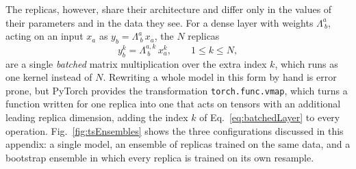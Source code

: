 The replicas, however, share their architecture and differ only in the values of their parameters and in the data they see.
%
For a dense layer with weights \(\Lambda^a_{\ b}\), acting on an input \(x_a\) as \(y_b = \Lambda^a_{\ b}\,x_a\), the \(N\) replicas
\begin{equation}
	y^{k}_{b} = \Lambda^{a,k}_{\ b}\,x^{k}_{a}, \qquad 1 \leq k \leq N,
	\label{eq:batchedLayer}
\end{equation}
are a single \emph{batched} matrix multiplication over the extra index \(k\), which runs as one kernel instead of \(N\).
%
Rewriting a whole model in this form by hand is error prone, but PyTorch provides the transformation \texttt{torch.func.vmap}, which turns a function written for one replica into one that acts on tensors with an additional leading replica dimension, adding the index \(k\) of Eq.~\ref{eq:batchedLayer} to every operation.
%
Fig.~\ref{fig:tsEnsembles} shows the three configurations discussed in this appendix: a single model, an ensemble of replicas trained on the same data, and a bootstrap ensemble in which every replica is trained on its own resample.

